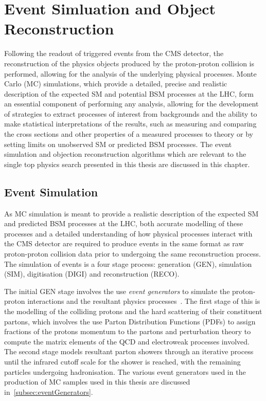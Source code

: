 \chapter{Event Simluation and Object Reconstruction}\label{chapter:data-mc}
Following the readout of triggered events from the CMS detector, the reconstruction of the physics objects produced by the proton-proton collision is performed, allowing for the analysis of the underlying physical processes.
Monte Carlo (MC) simulations, which provide a detailed, precise and realistic description of the expected SM and potential BSM processes at the LHC, form an essential component of performing any analysis, allowing for the development of strategies to extract processes of interest from backgrounds and the ability to make statistical interpretations of the results, such as measuring and comparing the cross sections and other properties of a measured processes to theory or by setting limits on unobserved SM or predicted BSM processes.
The event simulation and objection reconstruction algorithms which are relevant to the single top physics search presented in this thesis are discussed in this chapter.

\section{Event Simulation}\label{sec:sim}
As MC simulation is meant to provide a realistic description of the expected SM and predicted BSM processes at the LHC, 
both accurate modelling of these processes and a detailed understanding of how physical processes interact with the CMS detector are required to produce events in the same format as raw proton-proton collision data prior to undergoing the same reconstruction process.
The simulation of events is a four stage process: generation (GEN), simulation (SIM), digitisation (DIGI) and reconstruction (RECO).

The initial GEN stage involves the use \emph{event generators} to simulate the proton-proton interactions and the resultant physics processes~\cite{Buckley:2011ms,Hoche:2014rga}.
The first stage of this is the modelling of the colliding protons and the hard scattering of their constituent partons, which involves the use Parton Distribution Functions (PDFs) to assign fractions of the protons momentum to the partons and perturbation theory to compute the matrix elements of the QCD and electroweak processes involved.
The second stage models resultant parton showers through an iterative process until the infrared cutoff scale for the shower is reached, with the remaining particles undergoing hadronisation.
The various event generators used in the production of MC samples used in this thesis are discussed in~\ref{subsec:eventGenerators}.

